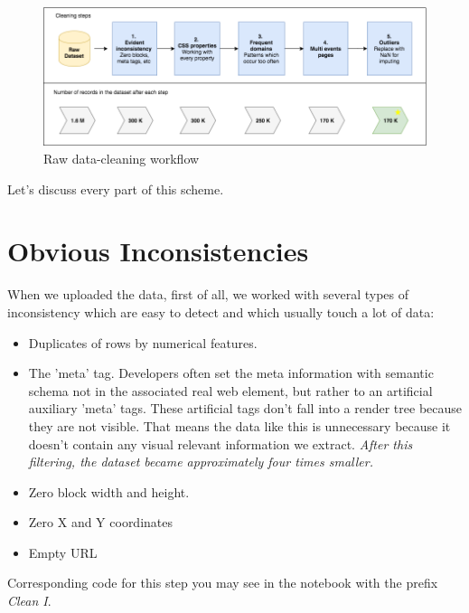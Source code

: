 \begin{figure}[h]
\begin{center}
\includegraphics[width=1.0\textwidth]{figures06/clean_workflow4}
\caption{Raw data-cleaning workflow}
\label{fig:clean}
\end{center}
\end{figure}

Let's discuss every part of this scheme.\\

\section{Obvious Inconsistencies}

When we uploaded the data, first of all, we worked with several types of inconsistency which are easy to detect and which usually touch a lot of data:

\begin{itemize}
    \item Duplicates of rows by numerical features.
    \item The 'meta' tag. Developers often set the meta information with semantic schema not in the associated real web element, but rather to an artificial auxiliary 'meta' tags. These artificial tags don't fall into a render tree because they are not visible. That means the data like this is unnecessary because it doesn't contain any visual relevant information we extract. \textit{After this filtering, the dataset became approximately four times smaller.}
    \item Zero block width and height.
    \item Zero X and Y coordinates
    \item Empty URL
\end{itemize}

Corresponding code for this step you may see in the notebook with the prefix \textit{Clean I}.


